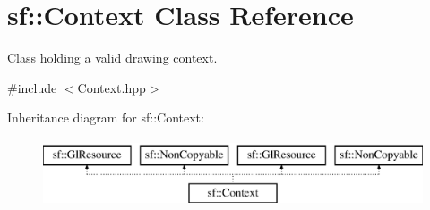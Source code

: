 \hypertarget{classsf_1_1_context}{\section{sf\-:\-:Context Class Reference}
\label{classsf_1_1_context}
}


Class holding a valid drawing context.  




{\ttfamily \#include $<$Context.\-hpp$>$}

Inheritance diagram for sf\-:\-:Context\-:\begin{figure}[H]
\begin{center}
\leavevmode
\includegraphics[height=2.000000cm]{classsf_1_1_context}
\end{center}
\end{figure}
